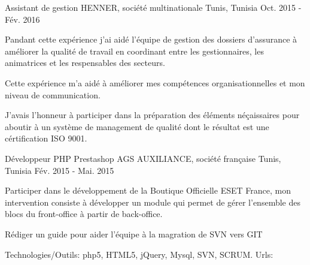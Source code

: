 \begin{cventries}
{    }
  \techentries
    {Assistant de gestion}
    {HENNER, société multinationale}
    {Tunis, Tunisia}
    {Oct. 2015 - Fév. 2016}
    {
      \begin{cvitems}
        \item {Pandant cette expérience j'ai aidé l'équipe de gestion des dossiers d'assurance à améliorer la qualité de travail en coordinant entre les gestionnaires, les animatrices et les respensables des secteurs.}
        \item {Cette expérience m'a aidé à améliorer mes compétences organisationnelles et mon niveau de communication.}
        \item {J'avais l'honneur à participer dans la préparation des éléments néçaissaires pour aboutir à un système de management de qualité dont le résultat est une cértification ISO 9001.}
      \end{cvitems}
    }
    {}{}{}
  \techentries
    {Développeur PHP Prestashop}
    {AGS AUXILIANCE, société française}
    {Tunis, Tunisia}
    {Fév. 2015 - Mai. 2015}
    {
      \begin{cvitems}
        \item {Participer dans le développement de la Boutique Officielle ESET France, mon intervention consiste à développer un module qui permet  de gérer l'ensemble des blocs du front-office à partir de back-office.}
        \item {Rédiger un guide pour aider l'équipe à la magration de SVN vers GIT}
      \end{cvitems}
    }
    {\textcolor{awesome}{Technologies/Outils: } {\color{graytext}}  {php5, HTML5, jQuery, Mysql, SVN, SCRUM.}}
    {Urls:} 
    {\href{https://www.boutique-eset.com/}{} \break}
    { }\break
\end{cventries}